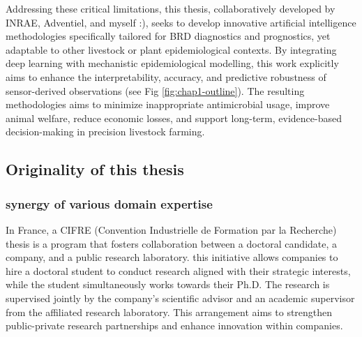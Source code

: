 Addressing these critical limitations, this thesis, collaboratively developed by INRAE, Adventiel, and myself :), seeks to develop innovative artificial intelligence methodologies specifically tailored for BRD diagnostics and prognostics, yet adaptable to other livestock or plant epidemiological contexts. By integrating deep learning with mechanistic epidemiological modelling, this work explicitly aims to enhance the interpretability, accuracy, and predictive robustness of sensor-derived observations (see Fig \ref{fig:chap1-outline}). The resulting methodologies aims to minimize inappropriate antimicrobial usage, improve animal welfare, reduce economic losses, and support long-term, evidence-based decision-making in precision livestock farming.




\subsection{Originality of this thesis}

\subsubsection{synergy of various domain expertise}

In France, a CIFRE (Convention Industrielle de Formation par la Recherche) thesis is a program that fosters collaboration between a doctoral candidate, a company, and a public research laboratory. this initiative allows companies to hire a doctoral student to conduct research aligned with their strategic interests, while the student simultaneously works towards their Ph.D. The research is supervised jointly by the company's scientific advisor and an academic supervisor from the affiliated research laboratory. This arrangement aims to strengthen public-private research partnerships and enhance innovation within companies.

